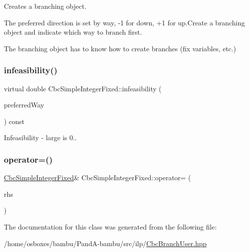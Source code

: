 Creates a branching object. 

The preferred direction is set by {\ttfamily way}, -\/1 for down, +1 for up.\+Create a branching object and indicate which way to branch first.

The branching object has to know how to create branches (fix variables, etc.) \mbox{\label{classCbcSimpleIntegerFixed_aa13190a7a35f67aeccf0ed37062e635e}} 
\subsubsection{\texorpdfstring{infeasibility()}{infeasibility()}}
{\footnotesize\ttfamily virtual double Cbc\+Simple\+Integer\+Fixed\+::infeasibility (\begin{DoxyParamCaption}\item[{int \&}]{preferred\+Way }\end{DoxyParamCaption}) const\hspace{0.3cm}{\ttfamily [virtual]}}



Infeasibility -\/ large is 0.. 

\mbox{\label{classCbcSimpleIntegerFixed_aa10030277dff562633a4a51bf4d988d7}} 
\subsubsection{\texorpdfstring{operator=()}{operator=()}}
{\footnotesize\ttfamily \hyperlink{classCbcSimpleIntegerFixed}{Cbc\+Simple\+Integer\+Fixed}\& Cbc\+Simple\+Integer\+Fixed\+::operator= (\begin{DoxyParamCaption}\item[{const \hyperlink{classCbcSimpleIntegerFixed}{Cbc\+Simple\+Integer\+Fixed} \&}]{rhs }\end{DoxyParamCaption})}



The documentation for this class was generated from the following file\+:\begin{DoxyCompactItemize}
\item 
/home/osboxes/bambu/\+Pand\+A-\/bambu/src/ilp/\hyperlink{CbcBranchUser_8hpp}{Cbc\+Branch\+User.\+hpp}\end{DoxyCompactItemize}
